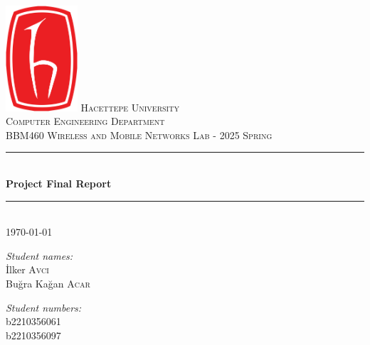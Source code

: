 \documentclass[11pt]{article}
\begin{document}
%


\begin{titlepage}
\newcommand{\HRule}{\rule{\linewidth}{0.5mm}}

\center

\includegraphics[width=0.2\textwidth]{logo.png}
\vfill
\textsc{\LARGE Hacettepe University}\\[0.5cm]
\textsc{\Large Computer Engineering Department}\\[1.5cm]
\textsc{\large BBM460 Wireless and Mobile Networks Lab - 2025 Spring}\\[0.5cm]

\HRule \\[0.4cm]
{ \huge \bfseries Project Final Report}\\[0.4cm] 
\HRule \\[0.3cm]
{\large \today}\\[2cm]
\begin{minipage}{0.4\textwidth}
\begin{flushleft} \large
\emph{Student names:}\\
İlker \textsc{Avcı} \\
Buğra Kağan \textsc{Acar}
\end{flushleft}
\end{minipage}
\begin{minipage}{0.4\textwidth}
\begin{flushright} \large
\emph{Student numbers:} \\
b2210356061 \\
b2210356097
\end{flushright}
\end{minipage}\\[2cm]
\vfill
\end{titlepage}
\end{document}
